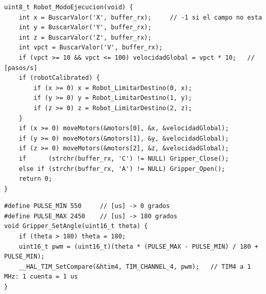 \begin{lstlisting}[caption={Modo ejecución: extracción de campos, recorte y programación de ejes (\texttt{robot\_logic.c}).}]
uint8_t Robot_ModoEjecucion(void) {
    int x = BuscarValor('X', buffer_rx);     // -1 si el campo no esta
    int y = BuscarValor('Y', buffer_rx);
    int z = BuscarValor('Z', buffer_rx);
    int vpct = BuscarValor('V', buffer_rx);
    if (vpct >= 10 && vpct <= 100) velocidadGlobal = vpct * 10;   // [pasos/s]
    if (robotCalibrated) {
        if (x >= 0) x = Robot_LimitarDestino(0, x);
        if (y >= 0) y = Robot_LimitarDestino(1, y);
        if (z >= 0) z = Robot_LimitarDestino(2, z);
    }
    if (x >= 0) moveMotors(&motors[0], &x, &velocidadGlobal);
    if (y >= 0) moveMotors(&motors[1], &y, &velocidadGlobal);
    if (z >= 0) moveMotors(&motors[2], &z, &velocidadGlobal);
    if      (strchr(buffer_rx, 'C') != NULL) Gripper_Close();
    else if (strchr(buffer_rx, 'A') != NULL) Gripper_Open();
    return 0;
}
\end{lstlisting}

\begin{lstlisting}[caption={Conversión de ángulo a PWM del servo (\texttt{gripper\_driver.c}).}]
#define PULSE_MIN 550     // [us] -> 0 grados
#define PULSE_MAX 2450    // [us] -> 180 grados
void Gripper_SetAngle(uint16_t theta) {
    if (theta > 180) theta = 180;
    uint16_t pwm = (uint16_t)(theta * (PULSE_MAX - PULSE_MIN) / 180 + PULSE_MIN);
    __HAL_TIM_SetCompare(&htim4, TIM_CHANNEL_4, pwm);   // TIM4 a 1 MHz: 1 cuenta = 1 us
}
\end{lstlisting}
